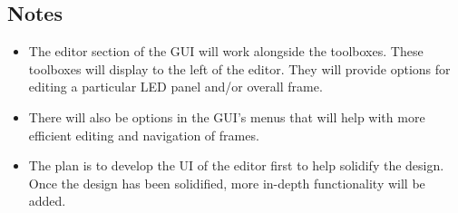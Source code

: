 	\subsection{Notes}
	\begin{itemize}
		\item The editor section of the GUI will work alongside the toolboxes. These toolboxes will display to the left of the editor. They will provide options for editing a particular LED panel and/or overall frame. %
		\item There will also be options in the GUI's menus that will help with more efficient editing and navigation of frames.
		\item The plan is to develop the UI of the editor first to help solidify the design. Once the design has been solidified, more in-depth functionality will be added.
	\end{itemize}
	
